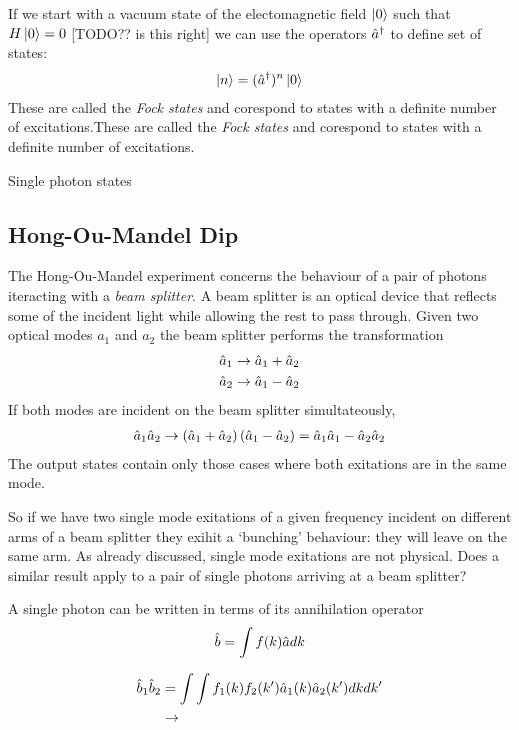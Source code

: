 If we start with a vacuum state of the electomagnetic field $\left\vert0\right\rangle$ such that $H\left\vert0\right\rangle = 0$ [TODO?? is this right] we can use the operators $\hat{a}^\dagger$ to define set of states:
\begin{align}
  \left\vert n\right\rangle = (\hat{a}^\dagger)^n \left\vert0\right\rangle
\end{align}
These are called the \textit{Fock states} and corespond to states with a definite number of excitations.These are called the \textit{Fock states} and corespond to states with a definite number of excitations.  


Single photon states

\subsection{Hong-Ou-Mandel Dip}

The Hong-Ou-Mandel experiment concerns the behaviour of a pair of photons iteracting with a \textit{beam splitter}. A beam splitter is an optical device that reflects some of the incident light while allowing the rest to pass through. Given two optical modes $a_1$ and $a_2$ the beam splitter performs the transformation
\begin{align}
  \hat{a}_{1} \rightarrow \hat{a}_{1} + \hat{a}_{2} \\
  \hat{a}_{2} \rightarrow \hat{a}_{1} - \hat{a}_{2}
\end{align}
If both modes are incident on the beam splitter simultateously,
\begin{align}
  \hat{a}_{1}\hat{a}_{2} \rightarrow \left(\hat{a}_{1} + \hat{a}_{2}\right) \left(\hat{a}_{1} - \hat{a}_{2}\right) = \hat{a}_{1}\hat{a}_{1} - \hat{a}_{2}\hat{a}_{2}
\end{align}
The output states contain only those cases where both exitations are in the same mode.

So if we have two single mode exitations of a given frequency incident on different arms of a beam splitter they exihit a `bunching' behaviour: they will leave on the same arm. As already discussed, single mode exitations are not physical. Does a similar result apply to a pair of single photons arriving at a beam splitter?

A single photon can be written in terms of its annihilation operator
\begin{align}
  \hat{b} = \int f(k) \hat{a} dk
\end{align}

\begin{align}
  \hat{b}_1 \hat{b}_2 & = \int \int f_1(k)f_2(k') \hat{a}_1(k) \hat{a}_2(k') dkdk' \\
                    & \rightarrow
\end{align}

